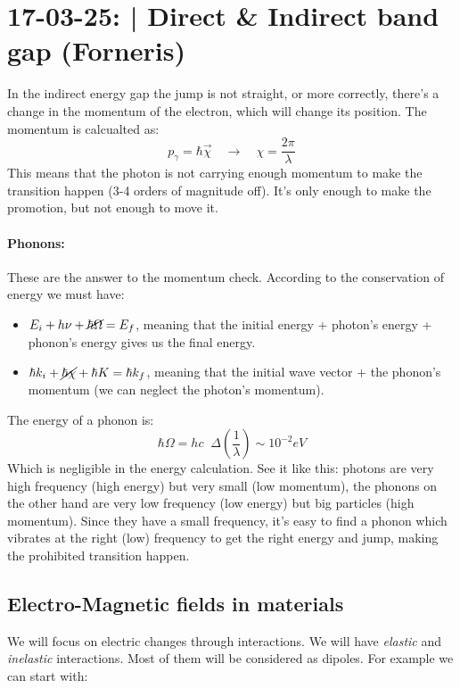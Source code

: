 \section{17-03-25: | Direct \& Indirect band gap (Forneris)}

In the indirect energy gap the jump is not straight, or more correctly, there's a change in the momentum of the electron, which will change its position. The momentum is calcualted as:
\begin{equation}
    p_{\gamma} = \hbar\vec{\chi} \quad \longrightarrow \quad \chi = \frac{2\pi}{\lambda}
\end{equation}
This means that the photon is not carrying enough momentum to make the transition happen (3-4 orders of magnitude off). It's only enough to make the promotion, but not enough to move it.

\paragraph{Phonons:} These are the answer to the momentum check. According to the conservation of energy we must have:
\begin{itemize}
    \item $E_i + h\nu + \cancel{\hbar\Omega} = E_f$, meaning that the initial energy + photon's energy + phonon's energy gives us the final energy.
    \item $\hbar k_i + \cancel{\hbar \chi} + \hbar K = \hbar k_f$, meaning that the initial wave vector + the phonon's momentum (we can neglect the photon's momentum).
\end{itemize} 
The energy of a phonon is:
\begin{equation}
    \hbar \Omega = hc \;\; \Delta \left(\frac{1}{\lambda}\right) \sim 10^{-2}eV
\end{equation}
Which is negligible in the energy calculation. See it like this: photons are very high frequency (high energy) but very small (low momentum), the phonons on the other hand are very low frequency (low energy) but big particles (high momentum).
Since they have a small frequency, it's easy to find a phonon which vibrates at the right (low) frequency to get the right energy and jump, making the prohibited transition happen.

\subsection{Electro-Magnetic fields in materials}

We will focus on electric changes through interactions. We will have \textit{elastic} and \textit{inelastic} interactions. Most of them will be considered as dipoles.
For example we can start with:
